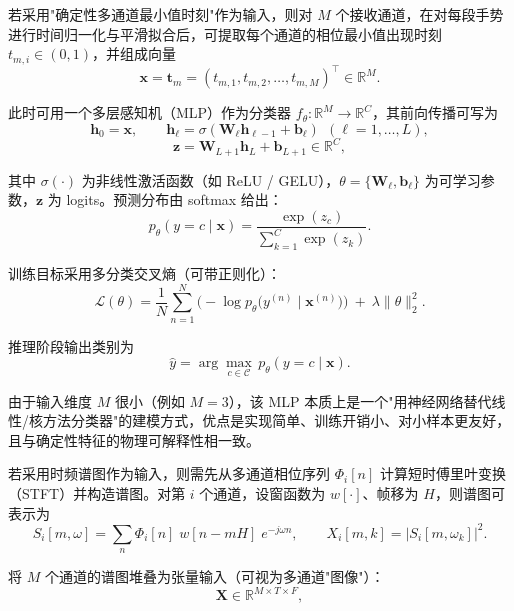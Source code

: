 若采用"确定性多通道最小值时刻"作为输入，则对 $M$ 个接收通道，在对每段手势进行时间归一化与平滑拟合后，可提取每个通道的相位最小值出现时刻 $t_{m,i}\in(0,1)$，并组成向量
\begin{equation}
\mathbf{x}=\mathbf{t}_m=(t_{m,1},t_{m,2},\dots,t_{m,M})^\top\in\mathbb{R}^{M}.
\end{equation}

此时可用一个多层感知机（MLP）作为分类器 $f_\theta:\mathbb{R}^{M}\to\mathbb{R}^{C}$，其前向传播可写为
\begin{equation}
\mathbf{h}_0=\mathbf{x},\qquad
\mathbf{h}_\ell=\sigma(\mathbf{W}_\ell \mathbf{h}_{\ell-1}+\mathbf{b}_\ell)\ \ (\ell=1,\dots,L),
\end{equation}
\begin{equation}
\mathbf{z}=\mathbf{W}_{L+1}\mathbf{h}_L+\mathbf{b}_{L+1}\in\mathbb{R}^{C},
\end{equation}

其中 $\sigma(\cdot)$ 为非线性激活函数（如 ReLU / GELU），$\theta=\{\mathbf{W}_\ell,\mathbf{b}_\ell\}$ 为可学习参数，$\mathbf{z}$ 为 logits。预测分布由 softmax 给出：
\begin{equation}
p_\theta(y=c\mid \mathbf{x})=\frac{\exp(z_c)}{\sum_{k=1}^{C}\exp(z_k)}.
\end{equation}

训练目标采用多分类交叉熵（可带正则化）：
\begin{equation}
\mathcal{L}(\theta)=\frac{1}{N}\sum_{n=1}^{N}\Big(-\log p_\theta\big(y^{(n)}\mid \mathbf{x}^{(n)}\big)\Big)\ +\ \lambda\|\theta\|_2^2.
\end{equation}

推理阶段输出类别为
\begin{equation}
\hat{y}=\arg\max_{c\in\mathcal{C}}\, p_\theta(y=c\mid \mathbf{x}).
\end{equation}

由于输入维度 $M$ 很小（例如 $M=3$），该 MLP 本质上是一个"用神经网络替代线性/核方法分类器"的建模方式，优点是实现简单、训练开销小、对小样本更友好，且与确定性特征的物理可解释性相一致。

若采用时频谱图作为输入，则需先从多通道相位序列 $\Phi_i[n]$ 计算短时傅里叶变换（STFT）并构造谱图。对第 $i$ 个通道，设窗函数为 $w[\cdot]$、帧移为 $H$，则谱图可表示为
\begin{equation}
S_i[m,\omega]=\sum_{n} \Phi_i[n]\;w[n-mH]\;e^{-j\omega n},
\qquad
X_i[m,k]=\left|S_i[m,\omega_k]\right|^2.
\end{equation}

将 $M$ 个通道的谱图堆叠为张量输入（可视为多通道"图像"）：
\begin{equation}
\mathbf{X}\in\mathbb{R}^{M\times T\times F},
\end{equation}

